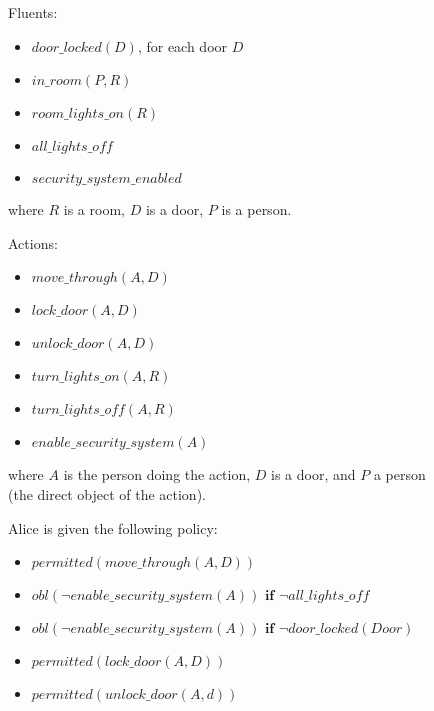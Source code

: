 \begin{figure}[H]
    \begin{framed}
        Fluents:
        \begin{itemize}
            \item $door\_locked(D)$, for each door $D$
            \item $in\_room(P, R)$
            \item $room\_lights\_on(R)$
            \item $all\_lights\_off$
            \item $security\_system\_enabled$
        \end{itemize}
        where $R$ is a room, $D$ is a door, $P$ is a person.

        Actions:
        \begin{itemize}
            \item $move\_through(A, D)$
            \item $lock\_door(A, D)$
            \item $unlock\_door(A, D)$
            \item $turn\_lights\_on(A, R)$
            \item $turn\_lights\_off(A, R)$
            \item $enable\_security\_system(A)$
        \end{itemize}
        where $A$ is the person doing the action, $D$ is a door, and $P$ a person (the direct object of the action).

        Alice is given the following policy:
        \begin{itemize}
            \item $permitted(move\_through(A, D))$
            \item $obl(\neg enable\_security\_system(A)) \textbf{ if } \neg all\_lights\_off$
            \item $obl(\neg enable\_security\_system(A)) \textbf{ if } \neg door\_locked(Door)$
            \item $permitted(lock\_door(A, D))$
            \item $permitted(unlock\_door(A, d))$
        \end{itemize}


\end{framed}
\end{figure}
